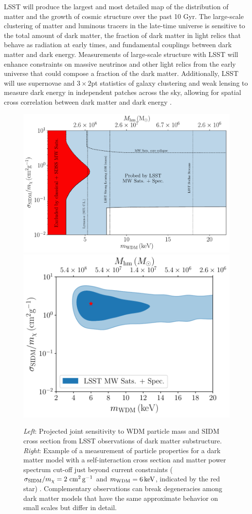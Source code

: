 \documentclass[12pt]{article}
\begin{document}
 LSST will produce the largest and most detailed map of the distribution of matter and the growth of cosmic structure over the past 10 Gyr.
The large-scale clustering of matter and luminous tracers in the late-time universe is sensitive to the total amount of dark matter, the fraction of dark matter in light relics that behave as radiation at early times, and fundamental couplings between dark matter and dark energy.
Measurements of large-scale structure with LSST will enhance constraints on massive neutrinos and other light relics from the early universe that could compose a fraction of the dark matter.
Additionally, LSST will use supernovae and $3\times2$pt statistics of galaxy clustering and weak lensing to measure dark energy in independent patches across the sky, allowing for spatial cross correlation between dark matter and dark energy \citep{0902.2590}.

\begin{figure}[t]
\centering
\includegraphics[width=0.53\columnwidth]{figures/SIDM_WDM_figw_coll.pdf}
\includegraphics[width=0.46\columnwidth]{figures/WDM_SIDM_discovery_test.pdf}
\caption{\emph{Left}: Projected joint sensitivity to WDM particle mass and SIDM cross section from LSST observations of dark matter substructure. 
\emph{Right}: Example of a measurement of particle properties for a dark matter model with a self-interaction cross section and matter power spectrum cut-off just beyond current constraints ($\sigma_{\rm SIDM}/m_\chi = 2 \mathrm{\,\mathrm{\,cm}^2\mathrm{\,g}^{-1}}$ and $m_{\rm WDM} = 6\mathrm{\,keV}$, indicated by the red star) \citep{drlica-wagner_2019_lsst_dark_matter}. Complementary observations can break degeneracies among dark matter models that have the same approximate behavior on small scales but differ in detail.}
\end{figure}
\end{document}

